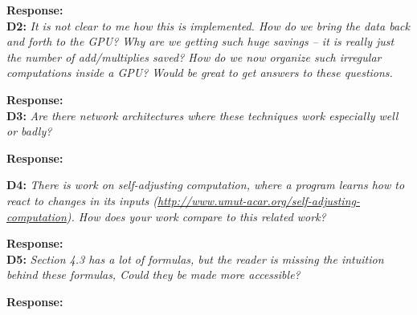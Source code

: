 \documentclass[preprint]{vldb}
\begin{document}
\vspace{2mm}
\noindent \textbf{Response:}\\

\vspace{2mm}
\noindent \textbf{D2:} \textit{It is not clear to me how this is implemented. How do we bring the data back and forth to the GPU? Why are we getting such huge savings -- it is really just the number of add/multiplies saved? How do we now organize such irregular computations inside a GPU? Would be great to get answers to these questions.}

\vspace{2mm}
\noindent \textbf{Response:}\\

\vspace{2mm}
\noindent \textbf{D3:} \textit{Are there network architectures where these techniques work especially well or badly?}

\vspace{2mm}
\noindent \textbf{Response:}\\

\vspace{2mm}
\begin{sloppypar}
\noindent \textbf{D4:} \textit{There is work on self-adjusting computation, where a program learns how to react to changes in its inputs (\url{http://www.umut-acar.org/self-adjusting-computation}).
How does your work compare to this related work?}
\end{sloppypar}

\vspace{2mm}
\noindent \textbf{Response:}\\

\vspace{2mm}
\noindent \textbf{D5:} \textit{Section 4.3 has a lot of formulas, but the reader is missing the intuition behind these formulas, Could they be made more accessible?}

\vspace{2mm}
\noindent \textbf{Response:}\\
\end{document}
